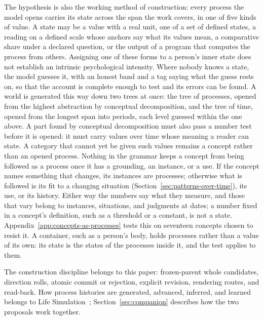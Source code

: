 \documentclass[11pt,a4paper]{article}
\begin{document}
The hypothesis is also the working method of construction: every process the
model opens carries its state across the span the work covers, in one of five
kinds of value. A state may be a value with a real unit, one of a set of defined states, a
reading on a defined scale whose anchors say what its values mean, a comparative
share under a declared question, or the output of a program that computes the
process from others. Assigning one of these forms to a person's inner state does
not establish an intrinsic psychological intensity. Where nobody knows a state,
the model guesses it, with an honest band and a tag saying what the guess rests
on, so that the account is complete enough to test and its errors can be found.
A world is generated this way down two trees at once: the tree of processes,
opened from the highest abstraction by conceptual decomposition, and the tree of
time, opened from the longest span into periods, each level guessed within the
one above.
A part found by conceptual decomposition must also pass a number test before it
is opened: it must carry values over time whose meaning a reader can state. A category that cannot yet be given such values remains a concept rather than
an opened process. Nothing in the grammar keeps a concept from being followed as
a process once it has a grounding, an instance, or a use. If the concept names
something that changes, its instances are processes; otherwise what is followed
is its fit to a changing situation (Section~\ref{sec:patterns-over-time}), its
use, or its history. Either way the numbers say what they measure, and those
that vary belong to instances, situations, and judgments at dates; a number
fixed in a concept's definition, such as a threshold or a constant, is not a
state. Appendix~\ref{app:concepts-as-processes} tests this on seventeen concepts
chosen to resist it. A container, such as a person's body, holds processes rather
than a value of its own: its state is the states of the processes inside it,
and the test applies to them.

The construction discipline belongs to this paper: frozen-parent whole
candidates, direction rolls, atomic commit or rejection, explicit revision,
rendering routes, and read-back. How process histories are generated, advanced,
inferred, and learned belongs to Life Simulation~\cite{westerbergLifeSimulation2026};
Section~\ref{sec:companion} describes how the two proposals work together.
\end{document}
